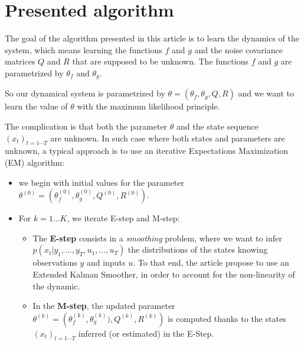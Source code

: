 \section{Presented algorithm}

The goal of the algorithm presented in this article is to learn the dynamics of the system, which means learning the functions $f$ and $g$  and the noise covariance matrices $Q$ and $R$ that are supposed to be unknown.
The functions $f$ and $g$ are parametrized by $\theta_f$ and $\theta_g$.

So our dynamical system is parametrized by $\theta = \left(\theta_f, \theta_g, Q, R \right)$ and we want to learn the value of $\theta$ with the maximum likelihood principle.

The complication is that both the parameter $\theta$ and the state sequence $(x_t)_{t=1 \cdots T}$ are unknown.
In such case where both states and parameters are unknown, a typical approach is to use an iterative Expectations Maximization (EM) algorithm:
\begin{itemize}
  \item we begin with initial values for the parameter $\theta^{(0)} = \left( \theta_f^{(0)}, \theta_g^{(0)}, Q^{(0)}, R^{(0)} \right)$. 
\item For $k=1 \ldots K$, we iterate E-step and M-step:
  \begin{itemize}
    
    \item The \textbf{E-step} consists in a \textit{smoothing} problem, where we want to infer \\ $p(x_t | y_1,\ldots,y_T, u_1,\ldots,u_T)$ the distributions of the states knowing observations $y$ and inputs $u$. To that end, the article propose to use an Extended Kalman Smoother, in order to account for the non-linearity of the dynamic. 
    \item In the \textbf{M-step}, the updated parameter $\theta^{(k)} = \left( \theta_f^{(k)}, \theta_g^{(k)}), Q^{(k)}, R^{(k)} \right)$ is computed thanks to the states $(x_t)_{t=1 \cdots T}$ inferred (or estimated) in the E-Step.
  \end{itemize}
\end{itemize}